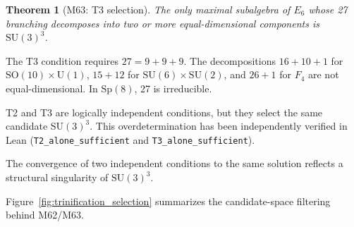 \documentclass[sn-mathphys-num,Numbered]{sn-jnl}
\theoremstyle{thmstyleone}
\newtheorem{theorem}{Theorem}[section]
\theoremstyle{thmstylethree}
\newcommand{\SU}{\mathrm{SU}}
\newcommand{\SO}{\mathrm{SO}}
\newcommand{\Sp}{\mathrm{Sp}}
\newcommand{\U}{\mathrm{U}}
\begin{document}
\begin{theorem}[M63: T3 selection]\label{thm:M63}
The only maximal subalgebra of $E_6$ whose 27 branching decomposes into two or
more equal-dimensional components is $\SU(3)^3$.
\end{theorem}

The T3 condition requires $27 = 9 + 9 + 9$.  The decompositions $16 + 10 + 1$
for $\SO(10) \times \U(1)$, $15 + 12$ for $\SU(6) \times \SU(2)$, and $26 +
1$ for $F_4$ are not equal-dimensional.  In $\Sp(8)$, 27 is irreducible.

T2 and T3 are logically independent conditions, but they select the same
candidate $\SU(3)^3$.  This overdetermination has been independently verified
in Lean (\texttt{T2\_alone\_sufficient} and \texttt{T3\_alone\_sufficient}).

The convergence of two independent conditions to the same solution reflects a
structural singularity of $\SU(3)^3$.

Figure~\ref{fig:trinification_selection} summarizes the candidate-space
filtering behind M62/M63.
\end{document}
